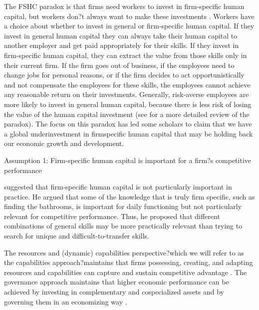 \documentclass[12pt,letterpaper]{article}
\begin{document}
The FSHC paradox is that firms need workers to invest in firm-specific human capital, but workers don?t always want to make these investments \citep{Wang2006}. Workers have a choice about whether to invest in general or firm-specific human capital. If they invest in general human capital they can always take their human capital to another employer and get paid appropriately for their skills. If
they invest in firm-specific human capital, they can extract the value from those skills only in their current firm. If the firm goes out of business, if the employees need to change jobs for personal reasons, or if the firm decides to act opportunistically and not compensate the employees for these skills, the employees cannot achieve any reasonable return on their investments. Generally, risk-averse employees are more likely to invest in general human capital, because there is less risk of losing the value of the human capital investment (see \cite{Wang2006} for a more detailed review of the paradox). The focus on this paradox has led some scholars to claim
that we have a global underinvestment in firmspecific human capital that may be holding back our economic growth and development.

Assumption 1: Firm-specific human capital is
important for a firm?s competitive performance

\cite{Lazear2009} suggested that firm-specific human capital is not particularly important in practice. He argued that some of the knowledge that is truly firm specific, such as finding the bathrooms, is important for daily functioning but not particularly relevant
for competitive performance. Thus, he proposed that different combinations of general skills may be more practically relevant than trying to search for unique and difficult-to-transfer skills.


The resources and (dynamic) capabilities perspective?which we will refer to as the capabilities approach?maintains that firms possessing, creating, and adapting resources and capabilities can capture and sustain competitive advantage \citep{Barney1991, 
Penrose1959, Teece1997}. The governance approach maintains that higher economic performance can be achieved by investing in complementary and cospecialized assets \citep{Helfat1997, Teece1986} and by governing them in an economizing way \citep{Oxley1997, Williamson1985}.
\end{document}
